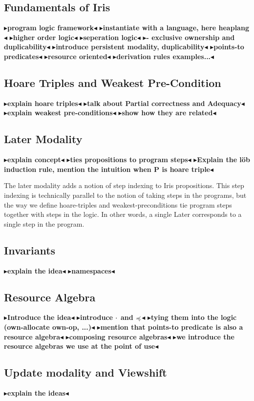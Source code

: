 \documentclass[a4paper, 10pt]{report}
\theoremstyle{definition}
\newcommand{\todo}[1]{{\color[rgb]{.5,0,0}\textbf{$\blacktriangleright$#1$\blacktriangleleft$}}}
\begin{document}
\subsection{Fundamentals of Iris}
\todo{program logic framework}
\todo{instantiate with a language, here heaplang}
\todo{higher order logic}
\todo{seperation logic}
\todo{- exclusive ownership and duplicability}
\todo{introduce persistent modality, duplicability}
\todo{points-to predicates}
\todo{resource oriented}
\todo{derivation rules examples...}

\subsection{Hoare Triples and Weakest Pre-Condition}
\todo{explain hoare triples}
\todo{talk about Partial correctness and Adequacy}
\todo{explain weakest pre-conditions}
\todo{show how they are related}

\subsection{Later Modality}
\todo{explain concept}
\todo{ties propositions to program steps}
\todo{Explain the löb induction rule, mention the intuition when P is hoare triple}

The later modality adds a notion of step indexing to Iris propositions. This step indexing is technically parallel to the notion of taking steps in the programs, but the way we define hoare-triples and weakest-preconditions tie program steps together with steps in the logic. In other words, a single Later corresponds to a single step in the program.

\subsection{Invariants}
\todo{explain the idea}
\todo{namespaces}

\subsection{Resource Algebra}
\todo{Introduce the idea}
\todo{introduce $\mathbin{\cdot}$ and $\mathrel{\stackrel{}{\preccurlyeq}}$}
\todo{tying them into the logic (own-allocate own-op, ...)}
\todo{mention that points-to predicate is also a resource algebra}
\todo{composing resource algebras}
\todo{we introduce the resource algebras we use at the point of use}

\subsection{Update modality and Viewshift}
\todo{explain the ideas}
\end{document}
